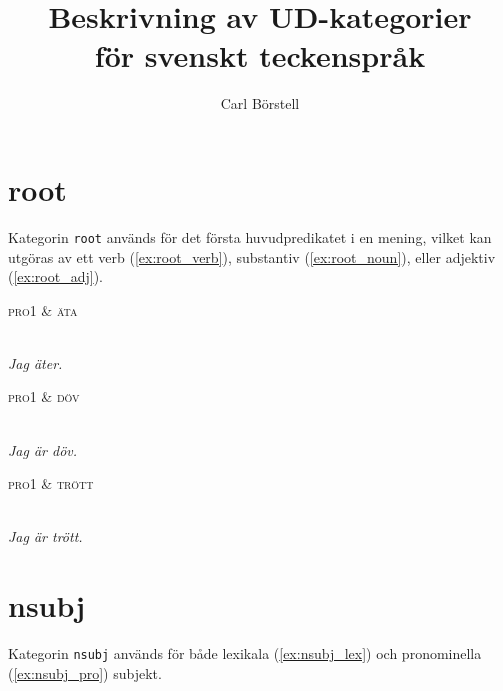 \documentclass[11pt,a4paper]{article}
\title{Beskrivning av UD-kategorier \\ för svenskt teckenspråk}
\author{Carl Börstell}
\begin{document}
\maketitle

\tableofcontents

\section{root}
Kategorin \texttt{root} används för det första huvudpredikatet i en mening, vilket kan utgöras av ett verb (\ref{ex:root_verb}), substantiv (\ref{ex:root_noun}), eller adjektiv (\ref{ex:root_adj}).

\begin{example}
\label{ex:root_verb}
\begin{dependency}[theme = simple]
   \begin{deptext}[column sep=1em]
      \textsc{pro1} \& \textsc{äta} \\
   \end{deptext}
\end{dependency}
\\
\textit{Jag äter.}
\end{example}

\begin{example}
\label{ex:root_noun}
\begin{dependency}[theme = simple]
   \begin{deptext}[column sep=1em]
      \textsc{pro1} \& \textsc{döv} \\
   \end{deptext}
\end{dependency}
\\
\textit{Jag är döv.}
\end{example}

\begin{example}
\label{ex:root_adj}
\begin{dependency}[theme = simple]
   \begin{deptext}[column sep=1em]
      \textsc{pro1} \& \textsc{trött} \\
   \end{deptext}
\end{dependency}
\\
\textit{Jag är trött.}
\end{example}


\section{nsubj}
Kategorin \texttt{nsubj} används för både lexikala (\ref{ex:nsubj_lex}) och pronominella (\ref{ex:nsubj_pro}) subjekt.
\end{document}
